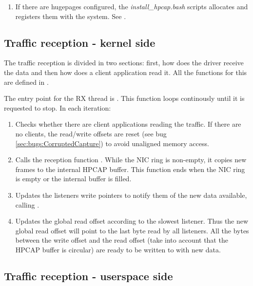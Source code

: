 \documentclass[oneside]{hpman}
\begin{document}
\begin{enumerate}
\item If there are hugepages configured, the \textit{install\_hpcap.bash} scripts allocates and registers them with the system. See .
\end{enumerate}

\subsection{Traffic reception - kernel side}

The traffic reception is divided in two sections: first, how does the driver receive the data and then how does a client application read it. All the functions for this are defined in .

The entry point for the RX thread is . This function loops continously until it is requested to stop. In each iteration:

\begin{enumerate}
\item Checks whether there are client applications reading the traffic. If there are no clients, the read/write offsets are reset (see bug \ref{sec:bugs:CorruptedCapture}) to avoid unaligned memory access.
\item Calls the reception function . While the NIC ring is non-empty, it copies new frames to the internal HPCAP buffer. This function ends when the NIC ring is empty or the internal buffer is filled.
\item Updates the listeners write pointers to notify them of the new data available, calling .
\item Updates the global read offset according to the slowest listener. Thus the new global read offset will point to the last byte read by all listeners. All the bytes between the write offset and the read offset (take into account that the HPCAP buffer is circular) are ready to be written to with new data.
\end{enumerate}

\subsection{Traffic reception - userspace side}
\end{document}

